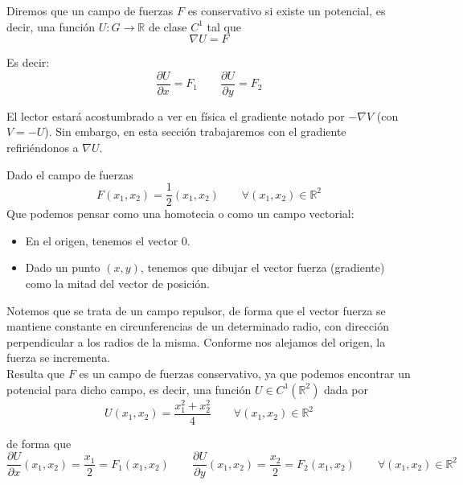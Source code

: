 \begin{definicion}
    Diremos que un campo de fuerzas $F$ es conservativo si existe un potencial, es decir, una función $U:G\rightarrow\mathbb{R}$ de clase $C^1$ tal que 
    \begin{equation*}
        \nabla U = F
    \end{equation*}

    Es decir:
    \begin{equation*}
        \dfrac{\partial U}{\partial x} = F_1 \qquad \dfrac{\partial U}{\partial y} = F_2
    \end{equation*}
\end{definicion}
\begin{observacion}
    El lector estará acostumbrado a ver en física el gradiente notado por $-\nabla V$ (con $V = -U$). Sin embargo, en esta sección trabajaremos con el gradiente refiriéndonos a $\nabla U$.
\end{observacion}

\begin{ejemplo}
    Dado el campo de fuerzas
    \begin{equation*}
        F(x_1,x_2) = \dfrac{1}{2}(x_1,x_2) \qquad \forall (x_1,x_2)\in \mathbb{R}^2
    \end{equation*}
    Que podemos pensar como una homotecia o como un campo vectorial:
    \begin{itemize}
        \item En el origen, tenemos el vector 0.
        \item Dado un punto $(x,y)$, tenemos que dibujar el vector fuerza (gradiente) como la mitad del vector de posición.
    \end{itemize}
    Notemos que se trata de un campo repulsor, de forma que el vector fuerza se mantiene constante en circunferencias de un determinado radio, con dirección perpendicular a los radios de la misma. Conforme nos alejamos del origen, la fuerza se incrementa.\\

    Resulta que $F$ es un campo de fuerzas conservativo, ya que podemos encontrar un potencial para dicho campo, es decir, una función $U\in C^1(\mathbb{R}^2)$ dada por
    \begin{equation*}
        U(x_1,x_2) = \dfrac{x_1^2 + x_2^2}{4} \qquad \forall (x_1,x_2)\in \mathbb{R}^2
    \end{equation*}

    de forma que
    \begin{equation*}
        \dfrac{\partial U}{\partial x}(x_1,x_2) = \dfrac{x_1}{2}= F_1(x_1,x_2) \qquad \dfrac{\partial U}{\partial y}(x_1,x_2) = \dfrac{x_2}{2} = F_2(x_1,x_2) \qquad \forall (x_1,x_2) \in \mathbb{R}^2
    \end{equation*}
\end{ejemplo}

